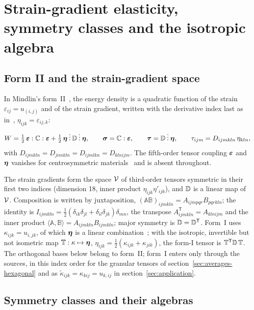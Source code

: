 \section{Strain-gradient elasticity, symmetry classes and the isotropic algebra}\label{sec:setting}

\subsection{Form II and the strain-gradient space}\label{sec:form-II}

In Mindlin's form~II~\cite{Mindlin1964,MindlinEshel1968}, the energy density is a
quadratic function of the strain $\varepsilon_{ij}=u_{(i,j)}$ and of the strain gradient,
written with the derivative index last as in~\cite{Lazar2016,Lazar2022},
$\eta_{ijk}=\varepsilon_{ij,k}$:
\begin{equation}
W=\tfrac12\,\bm{\varepsilon}:\mathbb{C}:\bm{\varepsilon}+\tfrac12\,\bm{\eta}\mathbin{\vdots}\mathbb{D}\mathbin{\vdots}\bm{\eta},\qquad
\bm{\sigma}=\mathbb{C}:\bm{\varepsilon},\qquad \bm{\tau}=\mathbb{D}\mathbin{\vdots}\bm{\eta},\qquad
\tau_{ijm}=D_{ijmkln}\,\eta_{kln},\label{eq:energy}
\end{equation}
with $D_{ijmkln}=D_{jimkln}=D_{ijmlkn}=D_{klnijm}$. The fifth-order tensor coupling
$\bm{\varepsilon}$ and $\bm{\eta}$ vanishes for centrosymmetric materials~\cite{Lazar2022} and is
absent throughout.

The strain gradients form the space $\mathcal{V}$ of third-order tensors symmetric in their first
two indices (dimension 18, inner product $\eta_{ijk}\eta'_{ijk}$), and $\mathbb{D}$ is a linear
map of $\mathcal{V}$. Composition is written by juxtaposition,
$(\mathbb A\mathbb B)_{ijmkln}=A_{ijmpqr}B_{pqrkln}$; the identity is
$I_{ijmkln}=\tfrac12(\delta_{ik}\delta_{jl}+\delta_{il}\delta_{jk})\delta_{mn}$, the
transpose $A^{\mathsf T}_{ijmkln}=A_{klnijm}$ and the inner product
$\langle\mathbb A,\mathbb B\rangle=A_{ijmkln}B_{ijmkln}$; major symmetry is
$\mathbb{D}=\mathbb{D}^{\mathsf T}$. Form~I uses $\kappa_{ijk}=u_{i,jk}$, of which $\bm{\eta}$ is a linear
combination~\cite{MindlinEshel1968}; with the isotropic, invertible
but not isometric map $\mathbb T:\kappa\mapsto\bm{\eta}$,
$\eta_{ijk}=\tfrac12(\kappa_{ijk}+\kappa_{jik})$, the form-I tensor is
$\mathbb T^{\mathsf T}\mathbb{D}\,\mathbb T$. The orthogonal bases below belong to form~II;
form~I enters only through the sources, in this index order for the granular tensors of
section~\ref{sec:averages-hexagonal} and as $\tilde\kappa_{ijk}=\kappa_{kij}=u_{k,ij}$ in
section~\ref{sec:application}.

\subsection{Symmetry classes and their algebras}\label{sec:algebras}

